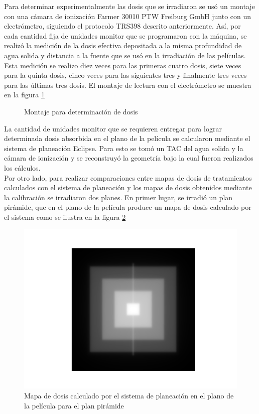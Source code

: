 Para determinar experimentalmente las dosis que se irradiaron se usó un montaje con una cámara de ionización Farmer 30010 PTW Freiburg GmbH junto con un electrómetro, siguiendo el protocolo TRS398 descrito anteriormente. Así, por cada cantidad fija de unidades monitor que se programaron con la máquina, se realizó la medición de la dosis efectiva depositada a la misma profundidad de agua solida y distancia a la fuente que se usó en la irradiación de las películas. Esta medición se realizo diez veces para las primeras cuatro dosis, siete veces para la quinta dosis, cinco veces para las siguientes tres y finalmente tres veces para las últimas tres dosis. El montaje de lectura con el electrómetro se muestra en la figura \ref{fig:Montajeelectrometro}\\
\begin{figure}
	\centering
	
	\caption{Montaje para determinación de dosis}
	\label{fig:Montajeelectrometro}
\end{figure}
La cantidad de unidades monitor que se requieren entregar para lograr determinada dosis absorbida en el plano de la película se calcularon mediante el sistema de planeación Eclipse. Para esto se tomó un TAC del agua solida y la cámara de ionización y se reconstruyó la geometría bajo la cual fueron realizados los cálculos.\\

Por otro lado, para realizar comparaciones entre mapas de dosis de tratamientos calculados con el sistema de planeación y los mapas de dosis obtenidos mediante la calibración  se irradiaron dos planes. En primer lugar, se irradió un plan pirámide, que en el plano de la película produce un mapa de dosis calculado por el sistema como se ilustra en la figura \ref{fig:TPSPiramide}\\

\begin{figure}
	\centering
	\includegraphics[width=0.7\linewidth]{images/piramideTPS.png}
	\caption{Mapa de dosis calculado por el sistema de planeación en el plano de la película para el plan pirámide}
	\label{fig:TPSPiramide}
\end{figure}

